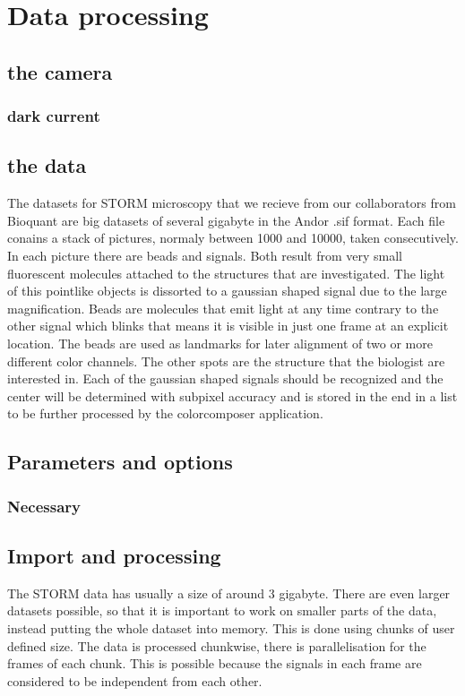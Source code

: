 \chapter{Data processing}
\section{the camera}
\subsection{dark current}

\section{the data}
The datasets for STORM microscopy that we recieve from our collaborators from
Bioquant are big datasets of several gigabyte in the Andor .sif format. Each
file conains a stack of pictures, normaly between 1000 and 10000, taken
consecutively.
In each picture there are beads and signals. Both result from very small 
fluorescent molecules attached to the structures that are investigated. The
light of this pointlike objects is dissorted to a gaussian shaped signal due to
the large magnification.
Beads are molecules that emit light at any time contrary to the other signal
which blinks that means it is visible in just one frame at an explicit location.
The beads are used as landmarks for later alignment of two or more different
color channels. The other spots are the structure that the biologist are
interested in. Each of the gaussian shaped signals should be recognized and the
center will be determined with subpixel accuracy and is stored in the end in a
list to be further processed by the colorcomposer application.

\section{Parameters and options}
\subsection{Necessary}

\section{Import and processing}
The STORM data has usually a size of around 3 gigabyte. There are even larger datasets possible, so that it is important to work on smaller parts of the data, instead putting the whole dataset into memory. This is done using chunks of user defined size. The data is processed chunkwise, there is parallelisation for the frames of each chunk. This is possible because the signals in each frame are considered to be independent from each other.  

